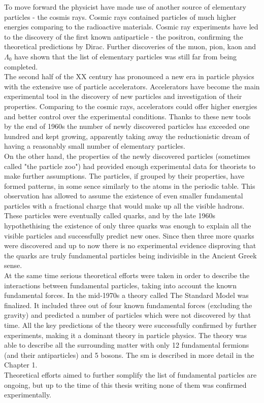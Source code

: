 To move forward the physicist have made use of another source of elementary particles - the cosmis rays. Cosmic rays contained particles of much higher energies comparing to the radioactive materials. Cosmic ray experiments have led to the discovery of the first known antiparticle - the positron\cite{positron_exp}, confirming the theoretical predictions by Dirac\cite{positron_th}. Further discoveries of the muon\cite{muon_exp}, pion\cite{pion}, kaon\cite{kaon} and $\Lambda_0$\cite{lambda0} have shown that the list of elementary particles was still far from being completed. \\
The second half of the XX century has pronounced a new era in particle physics with the extensive use of particle accelerators. Accelerators have become the main experimental tool in the discovery of new particles and investigation of their properties. Comparing to the cosmic rays, accelerators could offer higher energies and better control over the experimental conditions. Thanks to these new tools by the end of 1960s the number of newly discovered particles has exceeded one hundred and kept growing, apparently taking away the reductionistic dream of having a reasonably small number of elementary particles. \\
On the other hand, the properties of the newly discovered particles (sometimes called "the particle zoo") had provided enough experimental data for theorists to make further assumptions. The particles, if grouped by their properties, have formed patterns, in some sence similarly to the atoms in the periodic table. This observation has allowed to assume the existence of even smaller fundamental particles with a fractional charge that would make up all the visible hadrons. These particles were eventually called quarks\cite{gellMann},\cite{zweig} and by the late 1960s hypothethising the existence of only three quarks was enough to explain all the visible particles and successfully predict new ones\cite{omega}. Since then three more quarks were discovered and up to now there is no experimental evidence disproving that the quarks are truly fundamental particles being indivisible in the Ancient Greek sense. \\
At the same time serious theoretical efforts were taken in order to describe the interactions between fundamental particles, taking into account the known fundamental forces. In the mid-1970s a theory called The Standard Model was finalized. It included three out of four known fundamental forces (excluding the gravity) and predicted a number of particles which were not discovered by that time. All the key predictions of the theory were successfully confirmed by further experiments, making it a dominant theory in particle physics. The theory was able to describe all the surrounding matter with only 12 fundamental fermions (and their antiparticles) and 5 bosons. The \gls{sm} is described in more detail in the Chapter 1.\\
Theoretical efforts aimed to further somplify the list of fundamental particles are ongoing, but up to the time of this thesis writing none of them was confirmed experimentally. 
